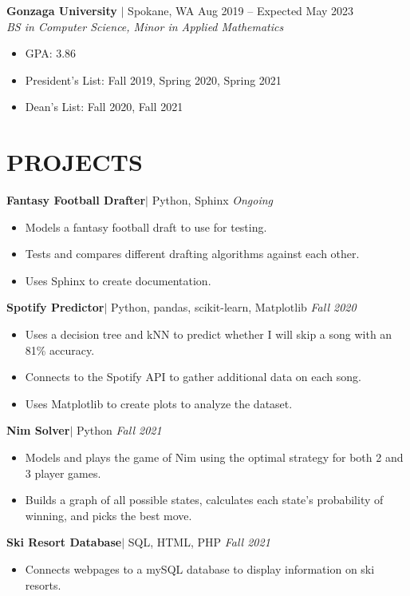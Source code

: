 \documentclass[11pt, a4paper, roman]{moderncv}
\newcommand{\project}[5]{
	\textbf{#1}\href{#2}{\:\small\faGithub\:}$|$ #3 
	\hfill\textit{#4}
	#5
	\vspace{2mm}
}
\newcommand{\education}[5]{
	\textbf{#1} $|$ #2
	\hfill#3
	\\\textit{#4}
	#5
	\vspace{2mm}
}
\begin{document}
{\education{Gonzaga University}{Spokane, WA}{Aug 2019 -- Expected May 2023}{BS in Computer Science, Minor in Applied Mathematics}
	{\begin{itemize}
    		\item GPA: 3.86
    		\item President's List: Fall 2019, Spring 2020, Spring 2021
    		\item Dean's List: Fall 2020, Fall 2021
	\end{itemize}
}

\section{PROJECTS}

\project{Fantasy Football Drafter}{https://github.com/GoneSahlin/fantasydraft}{Python, Sphinx}{Ongoing}
	{\begin{itemize}
		\item Models a fantasy football draft to use for testing.
		\item Tests and compares different drafting algorithms against each other.
		\item Uses Sphinx to create documentation.
	\end{itemize}}
}
{\project{Spotify Predictor}{https://github.com/GoneSahlin/CPSC222Final}{Python, pandas, scikit-learn, Matplotlib}{Fall 2020}
	{\begin{itemize}
    		\item Uses a decision tree and kNN to predict whether I will skip a song with an 81\% accuracy.
    		\item Connects to the Spotify API to gather additional data on each song.
   		 \item Uses Matplotlib to create plots to analyze the dataset.
	\end{itemize}}
}
{\project{Nim Solver}{https://github.com/GoneSahlin/Nim}{Python}{Fall 2021}
	{\begin{itemize}
    		\item Models and plays the game of Nim using the optimal strategy for both 2 and 3 player games.
    		\item Builds a graph of all possible states, calculates each state's probability of winning, and picks the best move.
	\end{itemize}}
}
{\project{Ski Resort Database}{https://github.com/GoneSahlin/321_Final_Project}{SQL, HTML, PHP}{Fall 2021}
	{\begin{itemize}
    		\item Connects webpages to a mySQL database to display information on ski resorts.
	\end{itemize}}
}
\end{document}
